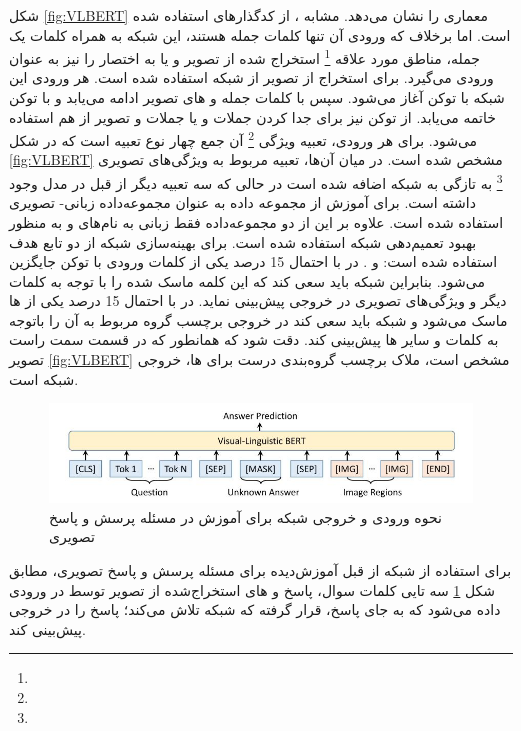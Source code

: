 	شکل
	\ref{fig:VLBERT}
	معماری 
		را نشان می‌دهد. مشابه 
	، از کدگذارهای
	استفاده شده است. اما برخلاف 
	که ورودی آن تنها کلمات جمله هستند، این شبکه به همراه کلمات یک جمله، مناطق مورد علاقه
	\footnote{}
	استخراج شده از تصویر و یا به اختصار
	را نیز به عنوان ورودی می‌گیرد. برای استخراج 
	از تصویر از شبکه 
	\cite{ren2015faster}
	استفاده شده است. هر ورودی این شبکه با توکن 
	\lr{[CLS]}
	آغاز می‌شود. سپس با کلمات جمله و 
	های تصویر ادامه می‌یابد و با توکن
	\lr{[END]}
	خاتمه می‌یابد. از توکن 
	\lr{[SEP]}
	نیز برای جدا کردن جملات و یا جملات و تصویر از هم استفاده می‌شود. برای هر ورودی، تعبیه ویژگی
	\footnote{}
	 آن جمع چهار نوع تعبیه است که در شکل 
	\ref{fig:VLBERT}
	 مشخص شده است. در میان آن‌ها، تعبیه مربوط به ویژگی‌های تصویری 
	\footnote{}
	 به تازگی به شبکه اضافه شده است در حالی که سه تعبیه دیگر از قبل در  مدل 
	 وجود داشته است. برای آموزش
	از مجموعه‌ داده
	به عنوان مجموعه‌داده زبانی- تصویری استفاده شده است. علاوه بر این از دو مجموعه‌داده فقط زبانی به نام‌های 
	و 
	به منظور بهبود تعمیم‌دهی شبکه استفاده شده است. برای بهینه‌سازی شبکه 
	از دو تابع هدف استفاده شده است: 
	و
	.
	در
	با احتمال 15 درصد یکی از کلمات ورودی با توکن
	\lr{[MASK]}
	جایگزین می‌شود. بنابراین شبکه باید سعی کند که این کلمه ماسک شده را با توجه به کلمات دیگر و ویژگی‌های تصویری در خروجی پیش‌بینی نماید. در 
	با احتمال 15 درصد یکی از 
	ها ماسک ‌می‌شود و شبکه باید سعی کند در خروجی برچسب گروه مربوط به آن 
	را باتوجه به کلمات و سایر 
	ها پیش‌بینی کند. دقت شود که همانطور که در قسمت سمت راست تصویر
	\ref{fig:VLBERT}
	مشخص است، ملاک برچسب گروه‌بندی درست برای
	ها، خروجی شبکه
	است. 
	\begin{figure}
		\centerline{\includegraphics[scale=0.6]{images/VLBERT_finetuning.JPG}}
		\caption[نحوه ورودی و خروجی شبکه برای آموزش در مسئله پرسش و پاسخ تصویری]{نحوه ورودی و خروجی شبکه برای آموزش در مسئله پرسش و پاسخ تصویری\cite{su2019vl}}
		\label{fig:VLBERT-finetuning}
	\end{figure}
	برای استفاده از شبکه از قبل آموزش‌دیده
	برای مسئله پرسش و پاسخ تصویری، مطابق شکل
	\ref{fig:VLBERT-finetuning}
	سه تایی کلمات سوال، پاسخ و 
	های استخراج‌شده از تصویر توسط
	در ورودی داده می‌شود که به جای پاسخ،
	\lr{[MASK]}
	قرار گرفته که شبکه تلاش می‌کند؛ پاسخ را در خروجی پیش‌بینی کند.
	
